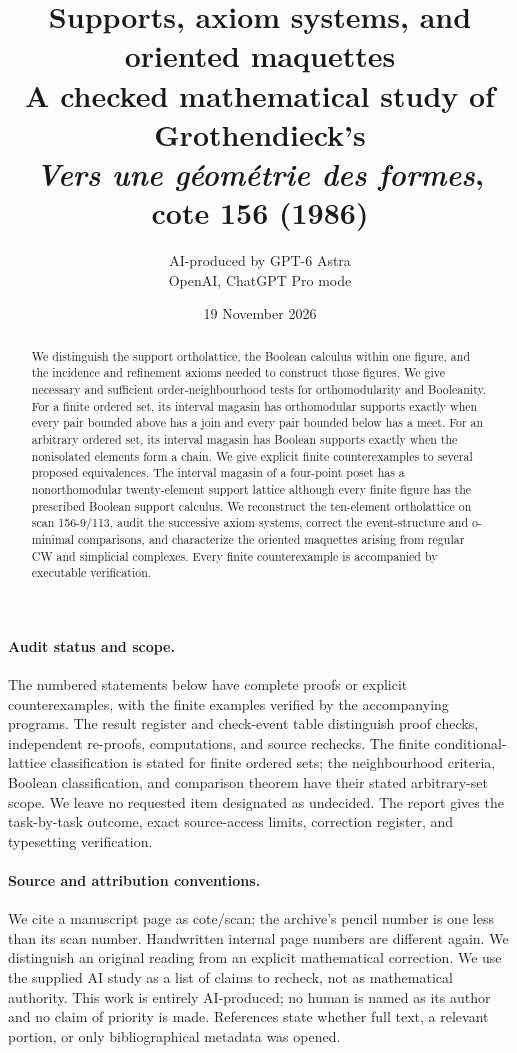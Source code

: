 \documentclass[11pt,a4paper]{article}
\title{Supports, axiom systems, and oriented maquettes\\
\large A checked mathematical study of Grothendieck's\\
\emph{Vers une géométrie des formes}, cote 156 (1986)}
\author{AI-produced by GPT-6 Astra\\
\small OpenAI, ChatGPT Pro mode}
\date{19 November 2026}
\theoremstyle{definition}
\begin{document}
\maketitle
\begin{abstract}
We distinguish the support ortholattice, the Boolean calculus within
one figure, and the incidence and refinement axioms needed to construct
those figures. We give necessary and sufficient order-neighbourhood
tests for orthomodularity and Booleanity. For a finite ordered set,
its interval magasin has orthomodular supports exactly when every
pair bounded above has a join and every pair bounded below has a
meet. For an arbitrary ordered set, its interval magasin has Boolean
supports exactly when the nonisolated elements form a chain. We give
explicit finite counterexamples to several proposed equivalences. The interval
magasin of a four-point poset has a nonorthomodular twenty-element
support lattice although every finite figure has the prescribed
Boolean support calculus. We reconstruct the ten-element ortholattice
on scan 156-9/113, audit the successive axiom systems, correct the
event-structure and o-minimal comparisons, and characterize the
oriented maquettes arising from regular CW and simplicial complexes.
Every finite counterexample is accompanied by executable verification.
\end{abstract}
\paragraph{Audit status and scope.}
The numbered statements below have complete proofs or explicit
counterexamples, with the finite examples verified by the accompanying
programs. The result register and check-event table distinguish proof
checks, independent re-proofs, computations, and source rechecks.
The finite conditional-lattice classification is stated for finite
ordered sets; the neighbourhood criteria, Boolean classification,
and comparison theorem have their stated arbitrary-set scope.
We leave no requested item designated as undecided. The report gives
the task-by-task outcome, exact source-access limits, correction
register, and typesetting verification.
\paragraph{Source and attribution conventions.}
We cite a manuscript page as cote/scan; the archive's pencil number is
one less than its scan number. Handwritten internal page numbers are
different again. We distinguish an original reading from an explicit
mathematical correction. We use the supplied AI study as a list of
claims to recheck, not as mathematical authority. This work is entirely
AI-produced; no human is named as its author and no claim of priority
is made. References state whether full text, a relevant portion, or
only bibliographical metadata was opened.
\tableofcontents
\clearpage
\end{document}
